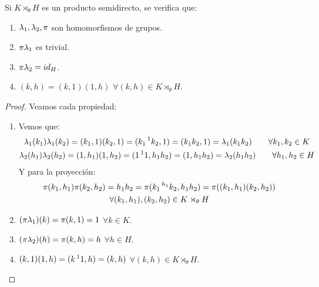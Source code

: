 \begin{prop}
    Si $K\rtimes_\theta H$ es un producto semidirecto, se verifica que:
    \begin{enumerate}
        \item $\lambda_1, \lambda_2, \pi$ son homomorfismos de grupos.
        \item $\pi \lambda_1$ es trivial.
        \item $\pi\lambda_2 = id_H$.
        \item $(k,h) = (k,1)(1,h)$ $\forall (k,h) \in K\rtimes_\theta H$.
    \end{enumerate}
    \begin{proof}
        Veamos cada propiedad:
        \begin{enumerate}
            \item Vemos que:
                \begin{gather*}
                    \lambda_1(k_1)\lambda_1(k_2) = (k_1,1)(k_2,1) = (k_1 \prescript{1}{}{k_2},1) = (k_1k_2, 1) = \lambda_1(k_1k_2) \qquad \forall k_1,k_2 \in K \\
                    \lambda_2(h_1)\lambda_2(h_2) = (1,h_1)(1,h_2) = (1\prescript{1}{}{1},h_1h_2) = (1,h_1h_2) = \lambda_2(h_1h_2) \qquad \forall h_1,h_2 \in H 
                \end{gather*}
                Y para la proyección:
                \begin{multline*}
                    \pi(k_1,h_1)\pi(k_2,h_2) = h_1h_2 = \pi(k_1\prescript{h_1}{}{k_2},h_1h_2) = \pi((k_1,h_1)(k_2,h_2)) \\ \forall (k_1,h_1),(k_2,h_2) \in K\rtimes_\theta H
                \end{multline*}
            \item $(\pi\lambda_1)(k) = \pi(k,1) = 1$ $\forall k\in K$.
            \item $(\pi\lambda_2)(h) = \pi(k,h) = h$ $\forall h\in H$.
            \item $(k,1)(1,h) = (k\prescript{1}{}{1},h) = (k,h)$ $\forall (k,h)\in K\rtimes_\theta H$.
        \end{enumerate}
    \end{proof}
\end{prop}

